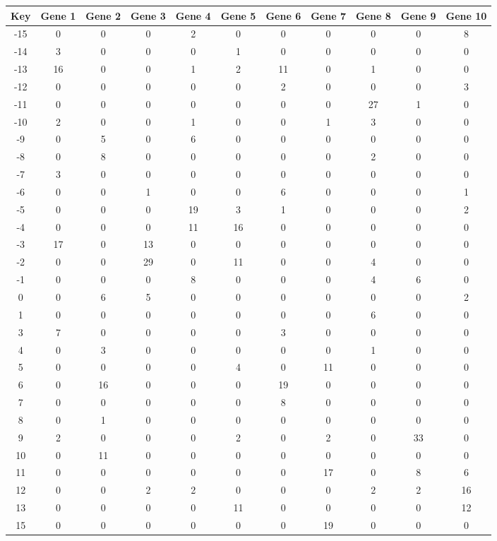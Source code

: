 \begin{tabular}{|c|c|c|c|c|c|c|c|c|c|c|}
\hline
Key & Gene 1 & Gene 2 & Gene 3 & Gene 4 & Gene 5 & Gene 6 & Gene 7 & Gene 8 & Gene 9 & Gene 10 \\
\hline
-15 & 0 & 0 & 0 & 2 & 0 & 0 & 0 & 0 & 0 & 8 \\
-14 & 3 & 0 & 0 & 0 & 1 & 0 & 0 & 0 & 0 & 0 \\
-13 & 16 & 0 & 0 & 1 & 2 & 11 & 0 & 1 & 0 & 0 \\
-12 & 0 & 0 & 0 & 0 & 0 & 2 & 0 & 0 & 0 & 3 \\
-11 & 0 & 0 & 0 & 0 & 0 & 0 & 0 & 27 & 1 & 0 \\
-10 & 2 & 0 & 0 & 1 & 0 & 0 & 1 & 3 & 0 & 0 \\
-9 & 0 & 5 & 0 & 6 & 0 & 0 & 0 & 0 & 0 & 0 \\
-8 & 0 & 8 & 0 & 0 & 0 & 0 & 0 & 2 & 0 & 0 \\
-7 & 3 & 0 & 0 & 0 & 0 & 0 & 0 & 0 & 0 & 0 \\
-6 & 0 & 0 & 1 & 0 & 0 & 6 & 0 & 0 & 0 & 1 \\
-5 & 0 & 0 & 0 & 19 & 3 & 1 & 0 & 0 & 0 & 2 \\
-4 & 0 & 0 & 0 & 11 & 16 & 0 & 0 & 0 & 0 & 0 \\
-3 & 17 & 0 & 13 & 0 & 0 & 0 & 0 & 0 & 0 & 0 \\
-2 & 0 & 0 & 29 & 0 & 11 & 0 & 0 & 4 & 0 & 0 \\
-1 & 0 & 0 & 0 & 8 & 0 & 0 & 0 & 4 & 6 & 0 \\
0 & 0 & 6 & 5 & 0 & 0 & 0 & 0 & 0 & 0 & 2 \\
1 & 0 & 0 & 0 & 0 & 0 & 0 & 0 & 6 & 0 & 0 \\
3 & 7 & 0 & 0 & 0 & 0 & 3 & 0 & 0 & 0 & 0 \\
4 & 0 & 3 & 0 & 0 & 0 & 0 & 0 & 1 & 0 & 0 \\
5 & 0 & 0 & 0 & 0 & 4 & 0 & 11 & 0 & 0 & 0 \\
6 & 0 & 16 & 0 & 0 & 0 & 19 & 0 & 0 & 0 & 0 \\
7 & 0 & 0 & 0 & 0 & 0 & 8 & 0 & 0 & 0 & 0 \\
8 & 0 & 1 & 0 & 0 & 0 & 0 & 0 & 0 & 0 & 0 \\
9 & 2 & 0 & 0 & 0 & 2 & 0 & 2 & 0 & 33 & 0 \\
10 & 0 & 11 & 0 & 0 & 0 & 0 & 0 & 0 & 0 & 0 \\
11 & 0 & 0 & 0 & 0 & 0 & 0 & 17 & 0 & 8 & 6 \\
12 & 0 & 0 & 2 & 2 & 0 & 0 & 0 & 2 & 2 & 16 \\
13 & 0 & 0 & 0 & 0 & 11 & 0 & 0 & 0 & 0 & 12 \\
15 & 0 & 0 & 0 & 0 & 0 & 0 & 19 & 0 & 0 & 0 \\
\hline
\end{tabular}